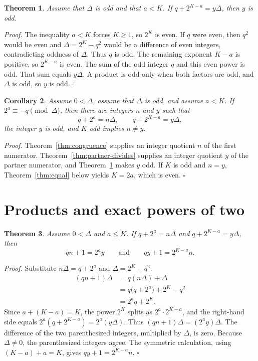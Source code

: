 \documentclass[11pt,letterpaper]{article}
\newtheorem{theorem}{Theorem}
\newtheorem{corollary}[theorem]{Corollary}
\newenvironment{proof}{\noindent\textit{Proof.}}{\hfill\(\square\)}
\begin{document}
\begin{theorem}
\label{thm:partner-odd}
Assume that \(\Delta\) is odd and that \(a<K\). If \(q+2^{K-a}=y\Delta\), then \(y\) is odd.
\end{theorem}

\begin{proof}
The inequality \(a<K\) forces \(K\ge 1\), so \(2^{K}\) is even. If \(q\) were even, then \(q^{2}\) would be even and \(\Delta=2^{K}-q^{2}\) would be a difference of even integers, contradicting oddness of \(\Delta\). Thus \(q\) is odd. The remaining exponent \(K-a\) is positive, so \(2^{K-a}\) is even. The sum of the odd integer \(q\) and this even power is odd. That sum equals \(y\Delta\). A product is odd only when both factors are odd, and \(\Delta\) is odd, so \(y\) is odd.
\end{proof}

\begin{corollary}
\label{cor:lane}
Assume \(0<\Delta\), assume that \(\Delta\) is odd, and assume \(a<K\). If \(2^{a}\equiv -q\pmod{\Delta}\), then there are integers \(n\) and \(y\) such that
\[
q+2^{a}=n\Delta,\qquad q+2^{K-a}=y\Delta,
\]
the integer \(y\) is odd, and \(K\) odd implies \(n\neq y\).
\end{corollary}

\begin{proof}
Theorem~\ref{thm:congruence} supplies an integer quotient \(n\) of the first numerator. Theorem~\ref{thm:partner-divides} supplies an integer quotient \(y\) of the partner numerator, and Theorem~\ref{thm:partner-odd} makes \(y\) odd. If \(K\) is odd and \(n=y\), Theorem~\ref{thm:equal} below yields \(K=2a\), which is even.
\end{proof}

\section{Products and exact powers of two}

\begin{theorem}
\label{thm:product}
Assume \(0<\Delta\) and \(a\le K\). If \(q+2^{a}=n\Delta\) and \(q+2^{K-a}=y\Delta\), then
\[
qn+1=2^{a}y\qquad\text{and}\qquad qy+1=2^{K-a}n.
\]
\end{theorem}

\begin{proof}
Substitute \(n\Delta=q+2^{a}\) and \(\Delta=2^{K}-q^{2}\):
\begin{align*}
(qn+1)\Delta
&=q(n\Delta)+\Delta\\
&=q\bigl(q+2^{a}\bigr)+2^{K}-q^{2}\\
&=2^{a}q+2^{K}.
\end{align*}
Since \(a+(K-a)=K\), the power \(2^{K}\) splits as \(2^{a}\cdot 2^{K-a}\), and the right-hand side equals \(2^{a}(q+2^{K-a})=2^{a}(y\Delta)\). Thus \((qn+1)\Delta=(2^{a}y)\Delta\). The difference of the two parenthesized integers, multiplied by \(\Delta\), is zero. Because \(\Delta\neq 0\), the parenthesized integers agree. The symmetric calculation, using \((K-a)+a=K\), gives \(qy+1=2^{K-a}n\).
\end{proof}
\end{document}
